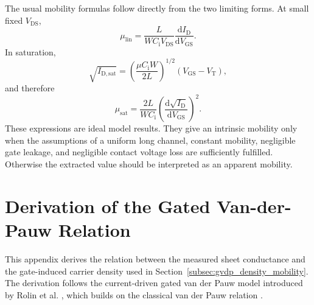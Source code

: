 \begin{appendix}
The usual mobility formulas follow directly from the two limiting forms. At
small fixed $V_\mathrm{DS}$,
\begin{equation}
    \mu_\mathrm{lin}
    =\frac{L}{W C_\mathrm{i}V_\mathrm{DS}}
    \frac{\mathrm{d}I_\mathrm{D}}{\mathrm{d}V_\mathrm{GS}}.
    \label{eq:app_fet_linear_mobility}
\end{equation}
In saturation,
\begin{equation}
    \sqrt{I_\mathrm{D,sat}}
    =\left(\frac{\mu C_\mathrm{i}W}{2L}\right)^{1/2}
    \left(V_\mathrm{GS}-V_\mathrm{T}\right),
    \label{eq:app_fet_sqrt_current}
\end{equation}
and therefore
\begin{equation}
    \mu_\mathrm{sat}
    =\frac{2L}{W C_\mathrm{i}}
    \left(
        \frac{\mathrm{d}\sqrt{I_\mathrm{D}}}
        {\mathrm{d}V_\mathrm{GS}}
    \right)^2.
    \label{eq:app_fet_saturation_mobility}
\end{equation}
These expressions are ideal model results. They give an intrinsic mobility only
when the assumptions of a uniform long channel, constant mobility, negligible
gate leakage, and negligible contact voltage loss are sufficiently fulfilled.
Otherwise the extracted value should be interpreted as an apparent mobility.

\chapter{Derivation of the Gated Van-der-Pauw Relation}
\label{app:gvdp_derivation}
\thispagestyle{plain}

This appendix derives the relation between the measured sheet conductance and
the gate-induced carrier density used in
Section~\ref{subsec:gvdp_density_mobility}. The derivation follows the
current-driven gated van der Pauw model introduced by Rolin et al.
\cite{Rolin2017GVDP}, which builds on the classical van der Pauw relation
\cite{VanDerPauw1958}.


\end{appendix}
